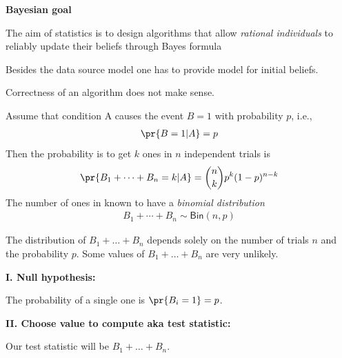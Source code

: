 \documentclass[landscape,footrule]{foils}
\begin{document}
\textbf{Bayesian goal}
\begin{triangles}
\item The aim of statistics is to design algorithms that allow \emph{rational individuals} to reliably update their beliefs through Bayes formula
\item Besides the data source model one has to provide model for initial beliefs.
\item Correctness of an algorithm does not make sense.
\end{triangles}



Assume that condition A causes the event $B=1$ with probability $p$, i.e.,
\begin{align*}
\pr{B=1|A}=p
\end{align*}
Then the probability is to get $k$ ones in $n$ independent trials is
\begin{align*}
\pr{B_1+\cdots+B_n=k|A}=\binom{n}{k}p^k(1-p)^{n-k}
\end{align*} 
The number of ones in known to have a \emph{binomial distribution}
\begin{align*}
 B_1+\cdots+B_n\sim\mathsf{Bin}(n, p)
\end{align*}


\vspace*{-1cm}

The distribution of  $B_1+\ldots+B_n$ depends solely on the number of trials $n$ and the probability $p$. Some values of $B_1+\ldots+B_n$ are very unlikely.


\textbf{I. Null hypothesis:}
\begin{triangles}
\item The probability of a single one is $\pr{B_i=1}=p$.
\end{triangles}
\vspace*{1cm}

\textbf{II. Choose value to compute aka test statistic:} 
\begin{triangles}
\item Our test statistic will be $B_1+\ldots+B_n$.
\end{triangles}
\vspace*{1cm}
\end{document}
